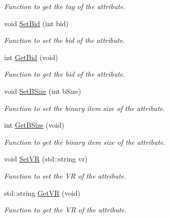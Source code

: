 \begin{DoxyCompactItemize}
\begin{DoxyCompactList}\small\item\em Function to get the tag of the attribute. \item\end{DoxyCompactList}\item 
void \hyperlink{class_attribute_a16a59367271d516785c18248f7f72669}{SetBid} (int bid)
\begin{DoxyCompactList}\small\item\em Function to set the bid of the attribute. \item\end{DoxyCompactList}\item 
int \hyperlink{class_attribute_a9532cbf8e10e2e6d7c1ad28502e2138e}{GetBid} (void)
\begin{DoxyCompactList}\small\item\em Function to get the bid of the attribute. \item\end{DoxyCompactList}\item 
void \hyperlink{class_attribute_a40f7c11646c5b6a50daf7982a630f55a}{SetBSize} (int bSize)
\begin{DoxyCompactList}\small\item\em Function to set the binary item size of the attribute. \item\end{DoxyCompactList}\item 
int \hyperlink{class_attribute_aa9399fc850d16e9f910be70a9a7805fc}{GetBSize} (void)
\begin{DoxyCompactList}\small\item\em Function to get the binary item size of the attribute. \item\end{DoxyCompactList}\item 
void \hyperlink{class_attribute_a6af6ca72eaae551aa0f44e0e7cccac9d}{SetVR} (std::string vr)
\begin{DoxyCompactList}\small\item\em Function to set the VR of the attribute. \item\end{DoxyCompactList}\item 
std::string \hyperlink{class_attribute_a7c58e62a7401a3ab1271019f8ed8bfdf}{GetVR} (void)
\begin{DoxyCompactList}\small\item\em Function to get the VR of the attribute. \item\end{DoxyCompactList}\item 

\end{DoxyCompactItemize}
